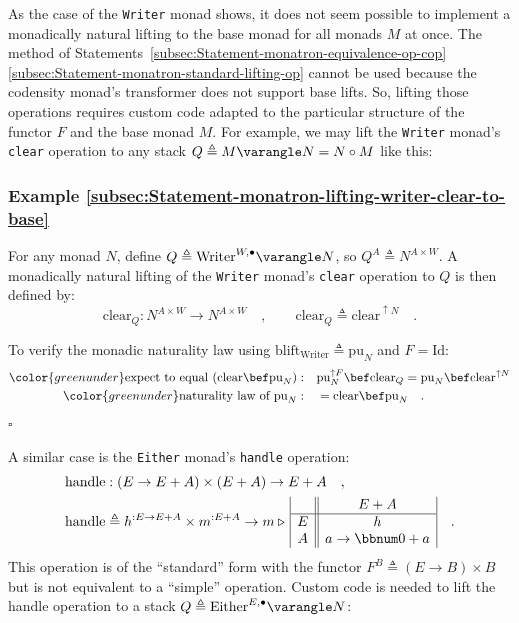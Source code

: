 As the case of the \lstinline!Writer! monad shows, it does not seem
possible to implement a monadically natural lifting to the base monad
for all monads $M$ at once. The method of Statements~\ref{subsec:Statement-monatron-equivalence-op-cop}\textendash \ref{subsec:Statement-monatron-standard-lifting-op}
cannot be used because the codensity monad\textsf{'}s transformer does not
support base lifts. So, lifting those operations requires custom code
adapted to the particular structure of the functor $F$ and the base
monad $M$. For example, we may lift the \lstinline!Writer! monad\textsf{'}s
\lstinline!clear! operation to any stack $Q\triangleq M\varangle N=N\circ M$
like this:

\subsubsection{Example \label{subsec:Statement-monatron-lifting-writer-clear-to-base}\ref{subsec:Statement-monatron-lifting-writer-clear-to-base}}

For any monad $N$, define $Q\triangleq\text{Writer}^{W,\bullet}\varangle N$,
so $Q^{A}\triangleq N^{A\times W}$. A monadically natural lifting
of the \lstinline!Writer! monad\textsf{'}s \lstinline!clear! operation to
$Q$ is then defined by:
\[
\text{clear}_{Q}:N^{A\times W}\rightarrow N^{A\times W}\quad,\quad\quad\text{clear}_{Q}\triangleq\text{clear}^{\uparrow N}\quad.
\]

To verify the monadic naturality law using $\text{blift}_{\text{Writer}}\triangleq\text{pu}_{N}$
and $F=\text{Id}$:
\begin{align*}
{\color{greenunder}\text{expect to equal }(\text{clear}\bef\text{pu}_{N}):}\quad & \text{pu}_{N}^{\uparrow F}\bef\text{clear}_{Q}=\text{pu}_{N}\bef\text{clear}^{\uparrow N}\\
{\color{greenunder}\text{naturality law of }\text{pu}_{N}:}\quad & =\text{clear}\bef\text{pu}_{N}\quad.
\end{align*}
$\square$

A similar case is the \lstinline!Either! monad\textsf{'}s \lstinline!handle!
operation:
\begin{align*}
 & \text{handle}:\left(E\rightarrow E+A\right)\times\left(E+A\right)\rightarrow E+A\quad,\\
 & \text{handle}\triangleq h^{:E\rightarrow E+A}\times m^{:E+A}\rightarrow m\triangleright\,\begin{array}{|c||c|}
 & E+A\\
\hline E & h\\
A & a\rightarrow\bbnum 0+a
\end{array}\quad.
\end{align*}
This operation is of the \textsf{``}standard\textsf{''} form with the functor $F^{B}\triangleq\left(E\rightarrow B\right)\times B$
but is not equivalent to a \textsf{``}simple\textsf{''} operation. Custom code is
needed to lift the handle operation to a stack $Q\triangleq\text{Either}^{E,\bullet}\varangle N$:

